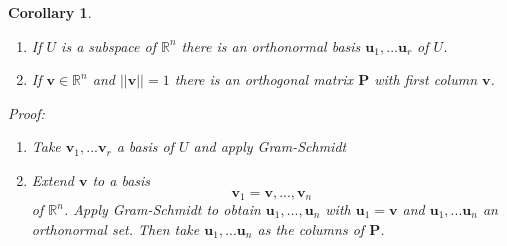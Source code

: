 \documentclass{report}
\newtheorem*{corollary}{Corollary}
\theoremstyle{remark}
\theoremstyle{definition}
\theoremstyle{definition}
\theoremstyle{theorem}
\renewcommand{\v}[1]{\mathbf{#1}}
\begin{document}
\begin{corollary}
\begin{enumerate}[label=\arabic*)]
    \item If $U$ is a subspace of $\mathbb{R}^n$ there is an orthonormal basis $\v{u}_1,...\v{u}_r$ of $U$.
    \item If $\v{v} \in \mathbb{R}^n$ and $||\v{v}||=1$ there is an orthogonal matrix $\v{P}$ with first column $\v{v}$.
\end{enumerate}
\emph{Proof:} \begin{enumerate}[label=\arabic*)]
    \item Take $\v{v}_1,...\v{v}_r$ a basis of $U$ and apply Gram-Schmidt
    \item Extend $\v{v}$ to a basis 
    \[\v{v}_1=\v{v},...,\v{v}_n\]
    of $\mathbb{R}^n$. Apply Gram-Schmidt to obtain $\v{u}_1,...,\v{u}_n$ with $\v{u}_1=\v{v}$ and $\v{u}_1,...\v{u}_n$ an orthonormal set. Then take $\v{u}_1,...\v{u}_n$ as the columns of $\v{P}$.
\end{enumerate}
\end{corollary}
\setcounter{subsubsection}{4}
\end{document}
